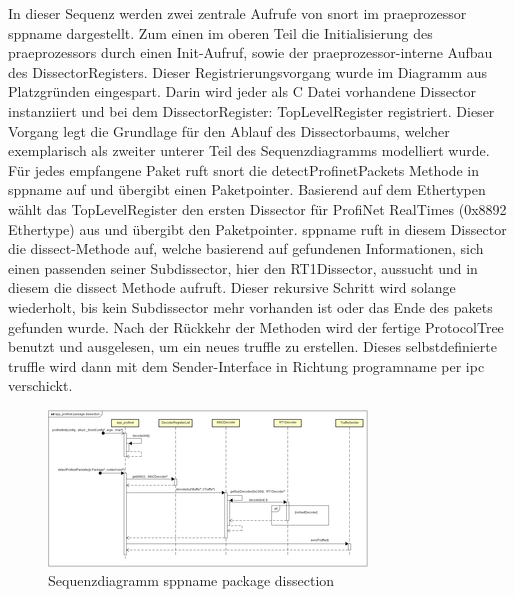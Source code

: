 
In dieser Sequenz werden zwei zentrale Aufrufe von \gls{snort} im \gls{praeprozessor} \gls{sppname} dargestellt. Zum einen im oberen Teil die Initialisierung des \gls{praeprozessor}s durch einen Init-Aufruf, sowie der \gls{praeprozessor}-interne Aufbau des DissectorRegisters. Dieser Registrierungsvorgang wurde im Diagramm aus Platzgründen eingespart. Darin wird jeder als C Datei vorhandene Dissector instanziiert und bei dem DissectorRegister: TopLevelRegister registriert. Dieser Vorgang legt die Grundlage für den Ablauf des Dissectorbaums, welcher exemplarisch als zweiter unterer Teil des Sequenzdiagramms modelliert wurde. Für jedes empfangene Paket ruft \gls{snort} die detectProfinetPackets Methode in \gls{sppname} auf und übergibt einen Paketpointer. Basierend auf dem Ethertypen wählt das TopLevelRegister den ersten Dissector für ProfiNet RealTimes (0x8892 Ethertype) aus und übergibt den Paketpointer. \gls{sppname} ruft in diesem Dissector die dissect-Methode auf, welche basierend auf gefundenen Informationen, sich einen passenden seiner Subdissector, hier den RT1Dissector, aussucht und in diesem die dissect Methode aufruft. Dieser rekursive Schritt wird solange wiederholt, bis kein Subdissector mehr vorhanden ist oder das Ende des \gls{paket}s gefunden wurde.
Nach der Rückkehr der Methoden wird der fertige ProtocolTree benutzt und ausgelesen, um ein neues \gls{truffle} zu erstellen. Dieses selbstdefinierte \gls{truffle} wird dann mit dem Sender-Interface in Richtung \gls{programname} per \gls{ipc} verschickt.

\begin{figure}[H]
  \centering
  \includegraphics[width=\textwidth]{../diagramimages/spp-profinet-package-dissection.png}
  \caption[Sequenzdiagramm \gls{sppname} package dissection]{Sequenzdiagramm \gls{sppname} package dissection}
  \label{fig:spp_sqd}
\end{figure} 